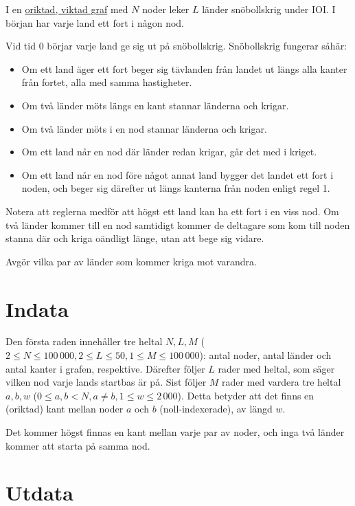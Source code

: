 I en \href{https://sv.wikipedia.org/wiki/Graf_(grafteori)}{oriktad, viktad graf}
med $N$ noder leker $L$ länder snöbollskrig under IOI.
I början har varje land ett fort i någon nod.

Vid tid $0$ börjar varje land ge sig ut på snöbollskrig. Snöbollskrig fungerar såhär:

\begin{itemize}
\item Om ett land äger ett fort beger sig tävlanden från landet ut längs alla kanter från fortet, alla med samma hastigheter.
\item Om två länder möts längs en kant stannar länderna och krigar.
\item Om två länder möts i en nod stannar länderna och krigar.
\item Om ett land når en nod där länder redan krigar, går det med i kriget.
\item Om ett land når en nod före något annat land bygger det landet ett fort i noden, och beger sig därefter ut längs kanterna från noden enligt regel 1.
\end{itemize}

Notera att reglerna medför att högst ett land kan ha ett fort i en viss nod.
Om två länder kommer till en nod samtidigt kommer de deltagare som kom till noden stanna där och kriga oändligt länge, utan att bege sig vidare.

Avgör vilka par av länder som kommer kriga mot varandra.

\section*{Indata}

Den första raden innehåller tre heltal $N,L,M$ ($2 \le N \le 100\,000, 2 \le L \le 50, 1 \le M \le 100\,000$):
antal noder, antal länder och antal kanter i grafen, respektive.
Därefter följer $L$ rader med heltal, som säger vilken nod varje lands startbas är på.
Sist följer $M$ rader med vardera tre heltal $a, b, w$ ($0 \le a,b < N, a \neq b, 1 \le w \le 2\,000$).
Detta betyder att det finns en (oriktad) kant mellan noder $a$ och $b$ (noll-indexerade), av längd $w$.

Det kommer högst finnas en kant mellan varje par av noder, och inga två länder kommer att starta på samma nod.

\section*{Utdata}

